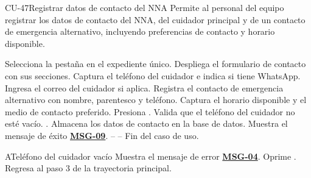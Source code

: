 \begin{UseCase}{CU-47}{Registrar datos de contacto del NNA}{
	Permite al personal del equipo registrar los datos de contacto del NNA, del cuidador principal y de un contacto de emergencia alternativo, incluyendo preferencias de contacto y horario disponible.
}
\end{UseCase}

\begin{UCtrayectoria}
	\UCpaso[\UCactor] Selecciona la pestaña  en el expediente único.
	\UCpaso Despliega el formulario de contacto con sus secciones.
	\UCpaso[\UCactor] Captura el teléfono del cuidador e indica si tiene WhatsApp.
	\UCpaso[\UCactor] Ingresa el correo del cuidador si aplica.
	\UCpaso[\UCactor] Registra el contacto de emergencia alternativo con nombre, parentesco y teléfono.
	\UCpaso[\UCactor] Captura el horario disponible y el medio de contacto preferido.
	\UCpaso[\UCactor] Presiona .
	\UCpaso Valida que el teléfono del cuidador no esté vacío. .
	\UCpaso Almacena los datos de contacto en la base de datos.
	\UCpaso Muestra el mensaje de éxito \hyperlink{mMSG09}{\bf MSG-09}.
	\UCpaso[] -- -- Fin del caso de uso.
\end{UCtrayectoria}

\begin{UCtrayectoriaA}{A}{Teléfono del cuidador vacío}
	\UCpaso Muestra el mensaje de error \hyperlink{mMSG04}{\bf MSG-04}.
	\UCpaso[\UCactor] Oprime .
	\UCpaso Regresa al paso 3 de la trayectoria principal.
\end{UCtrayectoriaA}

